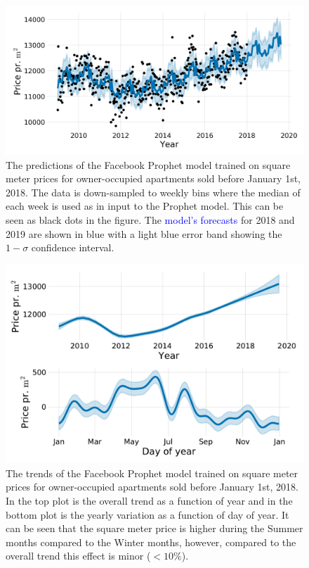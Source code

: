 \begin{figure}[h!]
  \includegraphics[draft=false, width=1\textwidth]{figures/housing/Villa_v18_cut_all_Ncols_all_prophet_forecast.png}
  \caption[Prophet Forecast for apartments]
          {The predictions of the Facebook Prophet model trained on square meter prices for owner-occupied apartments sold before January 1st, 2018. The data is down-sampled to weekly bins where the median of each week is used as in input to the Prophet model. This can be seen as black dots in the figure. The \textcolor{blue}{model's forecasts} for 2018 and 2019 are shown in blue with a light blue \textcolor{light-blue}{error band} showing the $1-\sigma$ confidence interval.
          }
  \label{fig:h:prophet_forecast_villa}
\end{figure}
\vspace{4cm}
\begin{figure}[h!]
  \includegraphics[draft=false, width=1\textwidth]{figures/housing/Villa_v18_cut_all_Ncols_all_prophet_trends.pdf}
  \caption[Prophet Trends]
          {The trends of the Facebook Prophet model trained on square meter prices for owner-occupied apartments sold before January 1st, 2018. In the top plot is the overall trend as a function of year and in the bottom plot is the yearly variation as a function of day of year. It can be seen that the square meter price is higher during the Summer months compared to the Winter months, however, compared to the overall trend this effect is minor ($<10\%$). 
          }
  \label{fig:h:prophet_trends_villa}
\end{figure}
\clearpage


